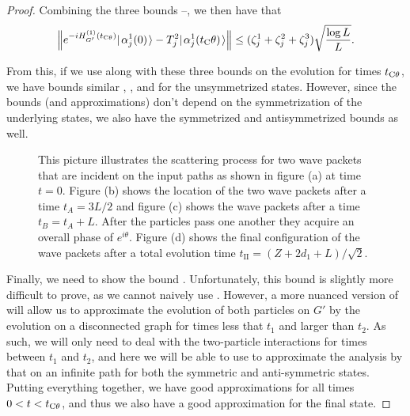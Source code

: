 \documentclass[../thesis-main/thesis-main]{subfiles}
\begin{document}
\begin{proof}
Combining the three bounds --, we then have that
\begin{align}
  \Big\Vert e^{-i H_{G'}^{(1)} (t_{\mathrm{C}\theta}) } |\mspace{2mu} \alpha_j^{1}(0) \mspace{2mu} \rangle - T_j^2 |\mspace{2mu} \alpha_j^{1}(t_\mathrm{C}\theta) \mspace{2mu} \rangle \Big\Vert \leq (\zeta_j^1 + \zeta_j^2 + \zeta_j^3)\sqrt{\frac{\log L}{L}}.
\end{align}

From this, if we use  along with these three bounds on the evolution for times $t_{\mathrm{C}\theta}$, we have bounds similar , , and  for the unsymmetrized states.  However, since the bounds (and approximations) don't depend on the symmetrization of the underlying states, we also have the symmetrized and antisymmetrized bounds as well.



\begin{figure}
  \centering
   
  \caption{This picture illustrates the scattering process for two wave packets that are incident on the input paths as shown in figure (a) at time $t=0$. Figure (b) shows the location of the two wave packets after a time $t_{A}={3L}/{2}$ and figure (c) shows the wave packets after a time $t_{B}=t_{A}+L$. After the particles pass one another they acquire an overall phase of $e^{i\theta}$. Figure (d) shows the final configuration of the wave packets after a total evolution time $t_{\mathrm{II}}={(Z+2d_{1}+L)}/{\sqrt{2}}$.}
  \label{fig:11_scattering_cartoon}
\end{figure}

Finally, we need to show the bound .  Unfortunately, this bound is slightly more difficult to prove, as we cannot naively use .  However, a more nuanced version of  will allow us to approximate the evolution of both particles on $G'$ by the evolution on a disconnected graph for times less that $t_1$ and larger than $t_2$.  As such, we will only need to deal with the two-particle interactions for times between $t_1$ and $t_2$, and here we will be able to use  to approximate the analysis by that on an infinite path for both the symmetric and anti-symmetric states.  Putting everything together, we have good approximations for all times $0 < t < t_{\mathrm{C}\theta}$, and thus we also have a good approximation for the final state.


\end{proof}
\end{document}
